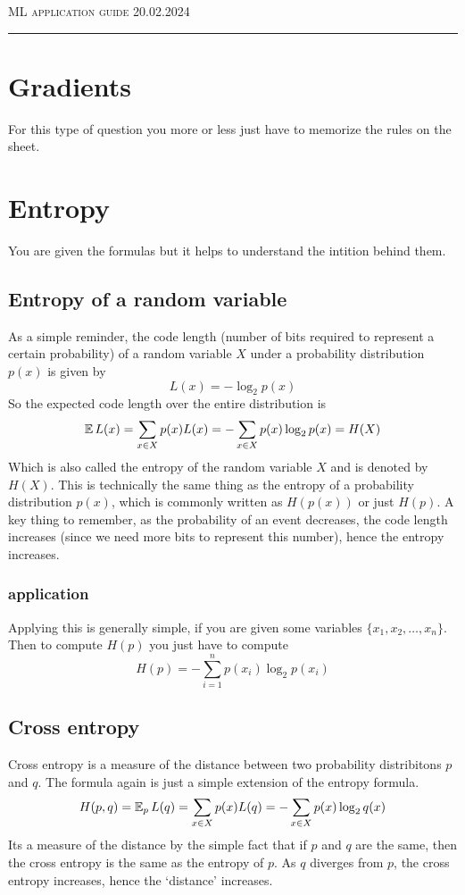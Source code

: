 \documentclass[12pt]{article}
\begin{document}
\thispagestyle{empty}

{\scshape ML } \hfill {\scshape \large application guide} \hfill {\scshape 20.02.2024}

\smallskip
\hrule
\bigskip

\tableofcontents

\section{Gradients}
For this type of question you more or less just have to memorize the rules on the sheet.

\section{Entropy}

You are given the formulas but it helps to understand the intition behind them. 

\smallskip
\subsection{Entropy of a random variable}
As a simple reminder, the code length (number of bits required to represent a certain probability) of a random variable $X$ under a probability distribution $p(x)$ is given by
\[
    L(x) = -\log_2 p(x)
\]
So the expected code length over the entire distribution is
\[
    \operatorname{\mathbb{E}}{L(x)} = \sum_{x\in X}p(x)L(x) = -\sum_{x\in X}p(x)\log_2 p(x) = H(X)
\]
Which is also called the entropy of the random variable $X$ and is denoted by $H(X)$. This is technically the same thing as the entropy of a probability distribution $p(x)$, which is commonly written as $H(p(x))$ or just $H(p)$. A key thing to remember, as the probability of an event decreases, the code length increases (since we need more bits to represent this number), hence the entropy increases.
\smallskip
\subsubsection*{application}
Applying this is generally simple, if you are given some variables $\{x_1, x_2, \ldots, x_n\}$. Then to compute $H(p)$ you just have to compute
\[
    H(p) = -\sum_{i=1}^{n}p(x_i)\log_2 p(x_i)
\]
\subsection{Cross entropy}
Cross entropy is a measure of the distance between two probability distribitons $p$ and $q$. The formula again is just a simple extension of the entropy formula.
\[
    H(p, q) = \operatorname{\mathbb{E}}_p{L(q)} = \sum_{x\in X}p(x)L(q) = -\sum_{x\in X}p(x)\log_2 q(x)
\] 
Its a measure of the distance by the simple fact that if $p$ and $q$ are the same, then the cross entropy is the same as the entropy of $p$. As $q$ diverges from $p$, the cross entropy increases, hence the `distance' increases.
\end{document}
